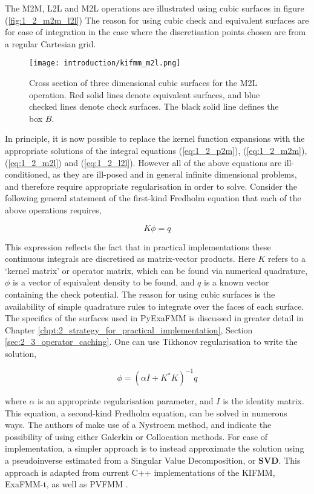 The \gls{M2M}, \gls{L2L} and \gls{M2L} operations are illustrated using cubic surfaces in figure (\ref{fig:1_2_m2m_l2l})
The reason for using cubic check and equivalent surfaces are for ease of integration
in the case where the discretisation points chosen are from a regular Cartesian
grid.

\begin{figure}[!h]
    \centering
    {\texttt{[image: introduction/kifmm\_m2l.png]}}
    \caption{Cross section of three dimensional cubic surfaces for the \gls{M2L} operation.
    Red solid lines denote equivalent surfaces, and blue checked lines denote check surfaces.
    The black solid line defines the box $B$.}
  \label{fig:1_2_m2l}
\end{figure}

In principle, it is now possible to replace the kernel function expansions with
the appropriate solutions of the integral equations (\ref{eq:1_2_p2m}),
(\ref{eq:1_2_m2m}), (\ref{eq:1_2_m2l}) and (\ref{eq:1_2_l2l}). However all of
the above equations are ill-conditioned, as they are ill-posed and in general infinite
dimensional problems, and therefore require appropriate regularisation in order to solve.
Consider the following general statement of the first-kind Fredholm equation
that each of the above operations requires,

\begin{equation}
K \phi = q
\label{eq:1_2_first_kind_fredholm}
\end{equation}

This expression reflects the fact that in practical implementations these continuous
integrals are discretised as matrix-vector products. Here $K$ refers to a
`kernel matrix' or operator matrix, which can be found via numerical quadrature, $\phi$ is a vector
of equivalent density to be found, and $q$ is a known vector containing the check
potential. The reason for using cubic surfaces is the availability of simple
quadrature rules to integrate over the faces of each surface. The specifics of
the surfaces used in PyExaFMM is discussed in greater detail in Chapter \ref{chpt:2_strategy_for_practical_implementation},
Section \ref{sec:2_3_operator_caching}. One can use Tikhonov regularisation to
write the solution,

\begin{equation}
\phi = (\alpha I + K^*K)^{-1}q
\label{eq:1_2_tikhonov}
\end{equation}

where $\alpha$ is an appropriate regularisation parameter, and $I$ is the identity
matrix. This equation, a second-kind Fredholm equation, can be solved in numerous
ways. The authors of \cite{Ying:2004:JCP} make use of a Nystroem method, and indicate
the possibility of using either Galerkin or Collocation methods. For ease of
implementation, a simpler approach is to instead approximate the solution using a pseudoinverse
estimated from a Singular Value Decomposition, or \textbf{\gls{SVD}}. This
approach is adapted from current C++ implementations of the \gls{KIFMM}, ExaFMM-t,
as well as PVFMM \cite{Malhotra:2015:CCP,exafmm}.

